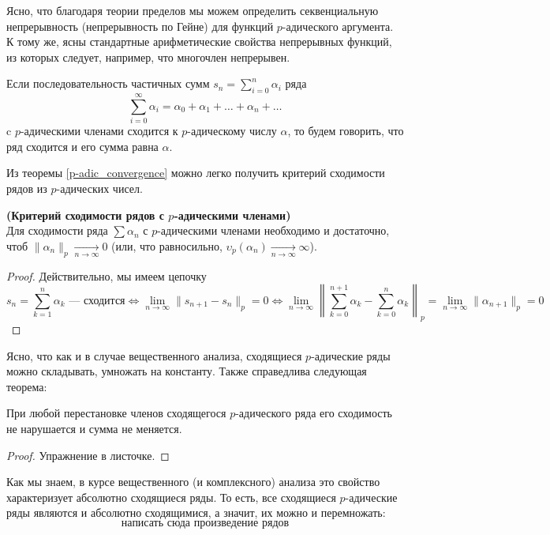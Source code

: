 \documentclass[11pt]{report}
\begin{document}
    Ясно, что благодаря теории пределов мы можем определить секвенциальную непрерывность (непрерывность по Гейне) для функций $p$-адического аргумента. \\
    К тому же, ясны стандартные арифметические свойства непрерывных функций, из которых следует, например, что многочлен непрерывен.

    \begin{definition}
        Если последовательность частичных сумм $s_n = \sum\limits_{i = 0}^{n} \alpha_i$ ряда
        \[ \sum\limits_{i = 0}^{\infty} \alpha_i = \alpha_0 + \alpha_1 + \ldots + \alpha_n + \ldots \]
        c $p$-адическими членами сходится к $p$-адическому числу $\alpha$, то будем говорить, что ряд сходится и его сумма равна $\alpha$.
    \end{definition}

    Из теоремы  \ref{p-adic_convergence} можно легко получить критерий сходимости рядов из $p$-адических чисел.

    \begin{theorem} \textbf{(Критерий сходимости рядов с $p$-адическими членами)}\\
        Для сходимости ряда $\sum \alpha_n$ с $p$-адическими членами необходимо и достаточно, чтоб $\| \alpha_n \|_p \xrightarrow[n \to \infty]{} 0$ (или, что равносильно,
        $ \upsilon_p{(\alpha_n)} \xrightarrow[n \to \infty]{} \infty$).
    \end{theorem}
    \begin{proof}
        Действительно, мы имеем цепочку
        \[ s_n = \sum\limits_{k = 1}^n \alpha_k \text{~--- сходится} \Leftrightarrow \lim\limits_{n \to \infty} \| s_{n + 1} - s_n \|_{p} = 0 \Leftrightarrow \lim\limits_{n \to \infty} \left\| \sum\limits_{k = 0}^{n + 1} \alpha_k - \sum\limits_{k = 0}^{n} \alpha_k \right\|_p = \lim\limits_{n \to \infty} \| \alpha_{n + 1} \|_{p} = 0 \]
    \end{proof}

    Ясно, что как и в случае вещественного анализа, сходящиеся $p$-адические ряды можно складывать, умножать на константу.
    Также справедлива следующая теорема:
    \begin{theorem}
        При любой перестановке членов сходящегося $p$-адического ряда его сходимость не нарушается и сумма не меняется.
    \end{theorem}
    \begin{proof}
        Упражнение в листочке.
    \end{proof}
    Как мы знаем, в курсе вещественного (и комплексного) анализа это свойство характеризует абсолютно сходящиеся ряды. То есть, все сходящиеся
    $p$-адические ряды являются и абсолютно сходящимися, а значит, их можно и перемножать:
    \[ \text{написать сюда произведение рядов} \]
\end{document}
